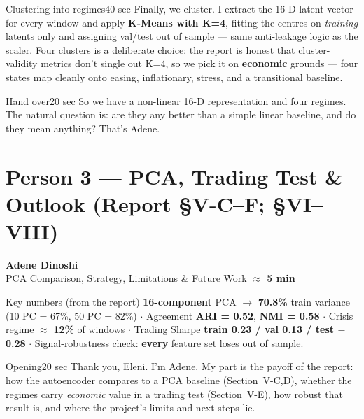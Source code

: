\documentclass[11pt]{article}
\newcommand{\personbanner}[3]{%
  \begin{tcolorbox}[enhanced, sharp corners, colback=accent, colframe=accent,
      left=14pt, right=14pt, top=10pt, bottom=10pt, before skip=4pt, after skip=10pt]
    {\sffamily\bfseries\LARGE\color{white} #1}\\[2pt]
    {\sffamily\color{white}\large #2}\hfill{\sffamily\bfseries\color{white} #3}
  \end{tcolorbox}}
\newcommand{\setp}[2]{\colorlet{accent}{#1}\colorlet{accentl}{#2}}
\begin{document}
\begin{cue}{Clustering into regimes}{40 sec}
Finally, we cluster. I extract the 16-D latent vector for every window and apply
\textbf{K-Means with K=4}, fitting the centres on \emph{training} latents only and
assigning val/test out of sample --- same anti-leakage logic as the scaler. Four
clusters is a deliberate choice: the report is honest that cluster-validity metrics
don't single out K=4, so we pick it on \textbf{economic} grounds --- four states map
cleanly onto easing, inflationary, stress, and a transitional baseline.
\end{cue}

\begin{cue}{Hand over}{20 sec}
So we have a non-linear 16-D representation and four regimes. The natural question
is: are they any better than a simple linear baseline, and do they mean anything?
That's Adene.
\end{cue}

\setp{p3}{p3l}
\section{Person 3 — PCA, Trading Test \& Outlook (Report §V-C–F; §VI–VIII)}
\personbanner{Adene Dinoshi}{PCA Comparison, Strategy, Limitations \& Future Work}{$\approx$ 5 min}

\begin{numbers}{Key numbers (from the report)}
\sffamily\small
\textbf{16-component} PCA $\to$ \textbf{70.8\%} train variance (10 PC = 67\%, 50 PC = 82\%) \;$\cdot$\;
Agreement \textbf{ARI = 0.52}, \textbf{NMI = 0.58} \;$\cdot$\;
Crisis regime $\approx$ \textbf{12\%} of windows \;$\cdot$\;
Trading Sharpe \textbf{train 0.23 / val 0.13 / test $-$0.28} \;$\cdot$\;
Signal-robustness check: \textbf{every} feature set loses out of sample.
\end{numbers}

\begin{cue}{Opening}{20 sec}
Thank you, Eleni. I'm Adene. My part is the payoff of the report: how the
autoencoder compares to a PCA baseline (Section~V-C,D), whether the regimes carry
\emph{economic} value in a trading test (Section~V-E), how robust that result is,
and where the project's limits and next steps lie.
\end{cue}
\end{document}
